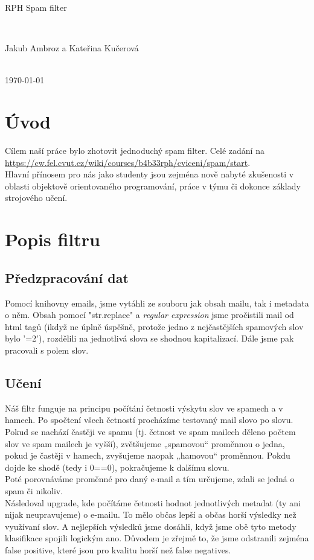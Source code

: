 \documentclass[12pt]{article}
\begin{document}
\author{Jakub Ambroz}
\begin{center}
    \begin{Huge}
    RPH Spam filter
    \end{Huge}\\
    \vspace{2mm}
    \begin{Large}Jakub Ambroz a Kateřina Kučerová\end{Large}\\
    \vspace{2mm}
    \today
\end{center}
\section{Úvod}
Cílem naší práce bylo zhotovit jednoduchý spam filter. Celé zadání na \url{https://cw.fel.cvut.cz/wiki/courses/b4b33rph/cviceni/spam/start}.\\
Hlavní přínosem pro nás jako studenty jsou zejména nově nabyté zkušenosti v oblasti objektově orientovaného programování, práce v týmu či dokonce základy strojového učení. 
\section{Popis filtru}
\subsection{Předzpracování dat}
Pomocí knihovny emails, jsme vytáhli ze souboru jak obsah mailu, tak i metadata o něm. Obsah pomocí "str.replace" a \emph{regular expression} jsme pročistili mail od html tagů (ikdyž ne úplně úspěšně, protože jedno z nejčastějších spamových slov bylo '=2'), rozdělili na jednotlivá slova se shodnou kapitalizací. Dále jsme pak pracovali s polem slov.
\subsection{Učení}
Náš filtr funguje na principu počítání četnosti výskytu slov ve spamech a v hamech. Po spočtení všech četností procházíme testovaný mail slovo po slovu. Pokud se nachází častěji ve spamu (tj. četnost ve spam mailech děleno počtem slov ve spam mailech je vyšší), zvětšujeme „spamovou“ proměnnou o jedna, pokud je častěji v hamech, zvyšujeme naopak „hamovou“ proměnnou. Pokdu dojde ke shodě (tedy i 0==0), pokračujeme k dalšímu slovu.\\
Poté porovnáváme proměnné pro daný e-mail a tím určujeme, zdali se jedná o spam či nikoliv.\\
Následoval upgrade, kde počítáme četnosti hodnot jednotlivých metadat (ty ani nijak neupravujeme) o e-mailu. To mělo občas lepší a občas horší výsledky než využívaní slov. A nejlepších výsledků jsme dosáhli, když jsme obě tyto metody klasifikace spojili logickým ano. Důvodem je zřejmě to, že jsme odstranili zejména false positive, které jsou pro kvalitu horší než false negatives.
\end{document}
